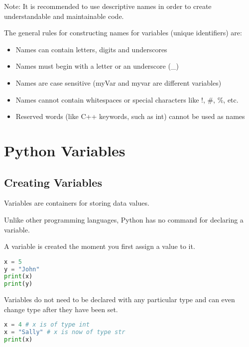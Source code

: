 \documentclass[12pt]{book}
\begin{document}
Note: It is recommended to use descriptive names in order to create understandable and maintainable code.

The general rules for constructing names for variables (unique identifiers) are:

\begin{itemize}
	\item Names can contain letters, digits and underscores
	\item Names must begin with a letter or an underscore (\_)
	\item Names are case sensitive (myVar and myvar are different variables)
	\item Names cannot contain whitespaces or special characters like !, \#, \%, etc.
	\item Reserved words (like C++ keywords, such as int) cannot be used as names

\end{itemize}



\section{Python Variables}

\subsection{Creating Variables}

Variables are containers for storing data values.

Unlike other programming languages, Python has no command for declaring a variable.

A variable is created the moment you first assign a value to it.

\lstset{style=mystyle}
\begin{lstlisting}[language=Python, caption=Python example]
x = 5
y = "John"
print(x)
print(y)
\end{lstlisting}



Variables do not need to be declared with any particular type and can even change type after they have been set.



\lstset{style=mystyle}
\begin{lstlisting}[language=Python, caption=Python example]
x = 4 # x is of type int
x = "Sally" # x is now of type str
print(x)
\end{lstlisting}
\end{document}
